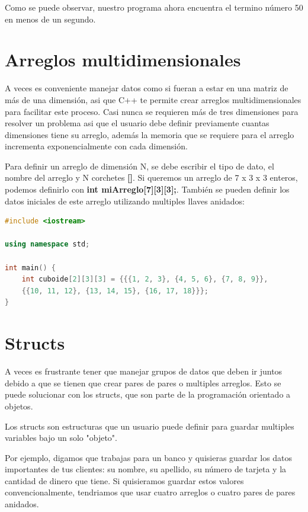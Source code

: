 \documentclass{article}
\begin{document}
Como se puede observar, nuestro programa ahora encuentra el termino número 50 en menos de un segundo.

\section{Arreglos multidimensionales}

A veces es conveniente manejar datos como si fueran a estar en una matriz de más de una dimensión, asi que C++ te permite crear arreglos multidimensionales para facilitar este proceso. Casi nunca se requieren más de tres dimensiones para resolver un problema asi que el usuario debe definir previamente cuantas dimensiones tiene su arreglo, además la memoria que se requiere para el arreglo incrementa exponencialmente con cada dimensión.

Para definir un arreglo de dimensión N, se debe escribir el tipo de dato, el nombre del arreglo y N corchetes \textbf{[]}. Si queremos un arreglo de 7 x 3 x 3 enteros, podemos definirlo con \textbf{int miArreglo[7][3][3];}. También se pueden definir los datos iniciales de este arreglo utilizando multiples llaves anidados:

\begin{lstlisting}[language=C++, caption=Asignando valores]
#include <iostream>

using namespace std;

int main() {
    int cuboide[2][3][3] = {{{1, 2, 3}, {4, 5, 6}, {7, 8, 9}},
    {{10, 11, 12}, {13, 14, 15}, {16, 17, 18}}};
}
\end{lstlisting}

\section{Structs}

A veces es frustrante tener que manejar grupos de datos que deben ir juntos debido a que se tienen que crear pares de pares o multiples arreglos. Esto se puede solucionar con los structs, que son parte de la programación orientado a objetos.

Los structs son estructuras que un usuario puede definir para guardar multiples variables bajo un solo "objeto".

Por ejemplo, digamos que trabajas para un banco y quisieras guardar los datos importantes de tus clientes: su nombre, su apellido, su número de tarjeta y la cantidad de dinero que tiene. Si quisieramos guardar estos valores convencionalmente, tendriamos que usar cuatro arreglos o cuatro pares de pares anidados.
\end{document}
